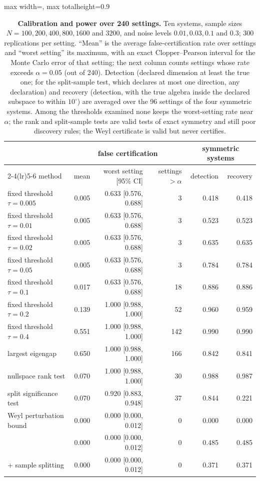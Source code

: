 \begin{table}[!tbp]
\centering\small
\begin{adjustbox}{max width=\textwidth, max totalheight=0.9\textheight}
\begin{tabular}{lrrrrr}
\toprule
& \multicolumn{3}{c}{false certification} & \multicolumn{2}{c}{symmetric systems} \\
\cmidrule(lr){2-4}\cmidrule(lr){5-6}
method & mean & worst setting [95\% CI] & settings $>\alpha$ & detection & recovery \\
\midrule
fixed threshold $\tau=0.005$ & 0.005 & 0.633 [0.576, 0.688] & 3 & 0.418 & 0.418 \\
fixed threshold $\tau=0.01$ & 0.005 & 0.633 [0.576, 0.688] & 3 & 0.523 & 0.523 \\
fixed threshold $\tau=0.02$ & 0.005 & 0.633 [0.576, 0.688] & 3 & 0.635 & 0.635 \\
fixed threshold $\tau=0.05$ & 0.005 & 0.633 [0.576, 0.688] & 3 & 0.784 & 0.784 \\
fixed threshold $\tau=0.1$ & 0.017 & 0.633 [0.576, 0.688] & 18 & 0.886 & 0.886 \\
fixed threshold $\tau=0.2$ & 0.139 & 1.000 [0.988, 1.000] & 52 & 0.960 & 0.959 \\
fixed threshold $\tau=0.4$ & 0.551 & 1.000 [0.988, 1.000] & 142 & 0.990 & 0.990 \\
largest eigengap & 0.650 & 1.000 [0.988, 1.000] & 166 & 0.842 & 0.841 \\
nullspace rank test & 0.070 & 1.000 [0.988, 1.000] & 30 & 0.988 & 0.987 \\
split significance test & 0.070 & 0.920 [0.883, 0.948] & 37 & 0.844 & 0.221 \\
Weyl perturbation bound & 0.000 & 0.000 [0.000, 0.012] & 0 & 0.000 & 0.000 \\
\midrule
\symcert{} & 0.000 & 0.000 [0.000, 0.012] & 0 & 0.485 & 0.485 \\
\symcert{} + sample splitting & 0.000 & 0.000 [0.000, 0.012] & 0 & 0.371 & 0.371 \\
\bottomrule
\end{tabular}
\end{adjustbox}
\caption{\textbf{Calibration and power over 240 settings.} Ten systems, sample sizes $N = 100, 200, 400, 800, 1600$ and $3200$, and noise levels $0.01, 0.03, 0.1$ and $0.3$; 300 replications per setting. ``Mean'' is the average false-certification rate over settings and ``worst setting'' its maximum, with an exact Clopper--Pearson interval for the Monte Carlo error of that setting; the next column counts settings whose rate exceeds $\alpha = 0.05$ (out of 240). Detection (declared dimension at least the true one; for the split-sample test, which declares at most one direction, any declaration) and recovery (detection, with the true algebra inside the declared subspace to within $10^\circ$) are averaged over the 96 settings of the four symmetric systems. Among the thresholds examined none keeps the worst-setting rate near $\alpha$; the rank and split-sample tests are valid tests of exact symmetry and still poor discovery rules; the Weyl certificate is valid but never certifies.}
\label{tab:calibration}
\end{table}
